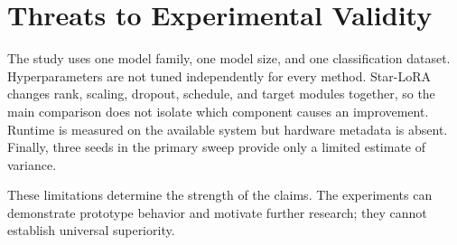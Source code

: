 \section{Threats to Experimental Validity}

The study uses one model family, one model size, and one classification dataset. Hyperparameters
are not tuned independently for every method. Star-LoRA changes rank, scaling, dropout, schedule,
and target modules together, so the main comparison does not isolate which component causes an
improvement. Runtime is measured on the available system but hardware metadata is absent.
Finally, three seeds in the primary sweep provide only a limited estimate of variance.

These limitations determine the strength of the claims. The experiments can demonstrate prototype
behavior and motivate further research; they cannot establish universal superiority.
